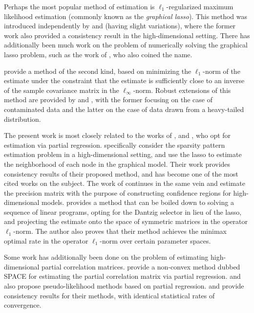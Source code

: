 \documentclass{article}
\begin{document}
Perhaps the most popular method of estimation is $\ell_1$-regularized maximum
likelihood estimation (commonly known as the \emph{graphical lasso}). This
method was introduced independently by \cite{Yuan07} and \cite{dAspremont08}
(having slight variations), where the former work also provided a consistency
result in the high-dimensional setting. There has additionally been much work
on the problem of numerically solving the graphical lasso problem, such as the
work of \cite{Friedman08}, who also coined the name. 

\cite{Cai11} provide a method of the second kind, based on minimizing the
$\ell_1$-norm of the estimate under the constraint that the estimate is
sufficiently close to an inverse of the sample covariance matrix in the
$\ell_\infty$-norm. Robust extensions of this method are provided by
\cite{Wang17} and \cite{Zhao14}, with the former focusing on the case of
contaminated data and the latter on the case of data drawn from a heavy-tailed
distribution.

The present work is most closely related to the works of \cite{Meinshausen06},
\cite{vandeGeer14} and \cite{Yuan10}, who opt for estimation via partial
regression. \citeauthor{Meinshausen06} specifically consider the sparsity
pattern estimation problem in a high-dimensional setting, and use the lasso
\citep{Tibshirani96} to estimate the neighborhood of each node in the graphical
model. Their work provides consistency results of their proposed method, and has
become one of the most cited works on the subject. The work of
\citeauthor{vandeGeer14} continues in the same vein and estimate the precision
matrix with the purpose of constructing confidence regions for high-dimensional
models. \citeauthor{Yuan10} provides a method that can be boiled down to solving
a sequence of linear programs, opting for the Dantzig selector \citep{Candes07}
in lieu of the lasso, and projecting the estimate onto the space of symmetric
matrices in the operator $\ell_1$-norm. The author also proves that their method
achieves the minimax optimal rate in the operator $\ell_1$-norm over certain
parameter spaces.

Some work has additionally been done on the problem of estimating
high-dimensional partial correlation matrices. \cite{Peng09} provide a
non-convex method dubbed SPACE for estimating the partial correlation matrix
via partial regression. \cite{Friedman10} and \cite{Khare15} also propose
pseudo-likelihood methods based on partial regression. \citeauthor{Peng09} and
\citeauthor{Khare15} provide consistency results for their methods, with
identical statistical rates of convergence.
\end{document}
